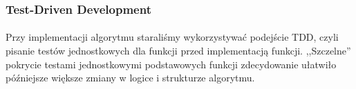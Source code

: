 \subsubsection{Test-Driven Development}
\paragraph{} Przy implementacji algorytmu staraliśmy wykorzystywać podejście TDD, czyli pisanie testów jednostkowych dla funkcji przed implementacją funkcji. ,,Szczelne'' pokrycie testami jednostkowymi podstawowych funkcji zdecydowanie ułatwiło późniejsze większe zmiany w logice i strukturze algorytmu.


